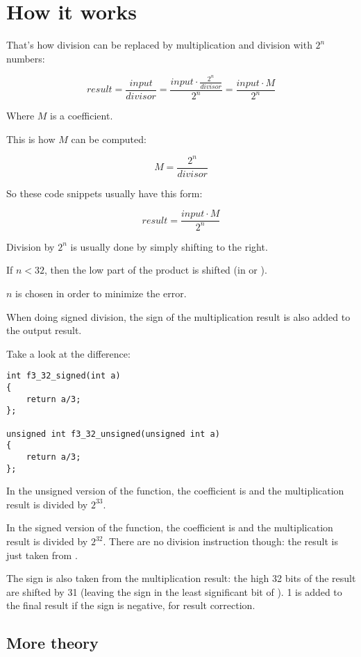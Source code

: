 ﻿\section{How it works}

That's how division can be replaced by multiplication and division with $2^{n}$ numbers:

\[
	result = 
	\frac{input}{divisor} = 
	\frac{input \cdot \frac{2^{n}}{divisor}}{2^{n}} = 
	\frac{input \cdot M}{2^{n}}
\]

Where $M$ is a  coefficient.

This is how $M$ can be computed:

\[
	M = \frac{2^{n}}{divisor}
\]

So these code snippets usually have this form:

\[
	result = \frac{input \cdot M}{2^{n}}
\]

%
Division by $2^{n}$ is usually done by simply shifting to the right.

If $n<32$, then the low part of the \gls{product} is shifted (in \EAX or \RAX).

$n$ is chosen in order to minimize the error.

When doing signed division, the sign of the multiplication result is also added to the output result.

Take a look at the difference:

\begin{lstlisting}
int f3_32_signed(int a)
{
	return a/3;
};

unsigned int f3_32_unsigned(unsigned int a)
{
	return a/3;
};
\end{lstlisting}

In the unsigned version of the function, the  coefficient is  
and the multiplication result is divided by $2^{33}$.

In the signed version of the function, the  coefficient is  
and the multiplication result is divided by $2^{32}$.
There are no division instruction though: the result is just taken from \EDX. 

The sign is also taken from the multiplication result: the high 32 bits of the result are shifted by 31
(leaving the sign in the least significant bit of \EAX).
1 is added to the final result if the sign is negative, for result correction.



\subsection{More theory}

